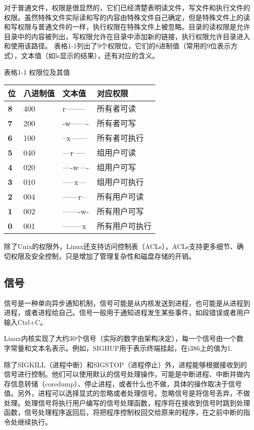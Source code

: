 对于普通文件，权限是很显然的，它们已经清楚表明读文件，写文件和执行文件的权限。虽然特殊文件实际读和写的内容由特殊文件自己确定，但是特殊文件上的读和写权限与普通文件的一样，执行权限在特殊文件上被忽略。目录的读权限是允许目录中的内容被列出，写权限允许在目录中添加新的链接，执行权限允许目录进入和使用该路径。 表格1-1列出了9个权限位，它们的8进制值（常用的9位表示方式），文本值（如ls显示的结果），还有对应的含义。
\begin{flushleft}
表格1-1 权限位及其值
\end{flushleft}
\begin{flushleft}
\begin{tabular}{p{2cm}p{2.8cm}p{2.8cm}p{3.0cm}}\toprule
\rowcolor[gray]{.9}
 \textbf{位} & \textbf{八进制值} & \textbf{文本值} & \textbf{对应权限}\\ \midrule
 \textbf 8 & 400 & r-------- & 所有者可读 \\ 
 \textbf 7 & 200 & -w------- & 所有者可写 \\ 
 \textbf 6 & 100 & --x------ & 所有者可执行 \\ 
 \textbf 5 & 040 & ---r----- & 组用户可读 \\ 
 \textbf 4 & 020 & ----w---- & 组用户可写 \\ 
 \textbf 3 & 010 & -----x--- & 组用户可执行 \\ 
 \textbf 2 & 004 & ------r-- & 所有用户可读 \\ 
 \textbf 1 & 002 & -------w- & 所有用户可写 \\ 
 \textbf 0 & 001 & --------x & 所有用户可执行 \\ 
 \end{tabular}
 \end{flushleft}
除了Unix的权限外，Linux还支持访问控制表（ACLs），ACLs支持更多细节、确切权限及安全控制，只是增加了管理复杂性和磁盘存储的开销。

\subsection{信号}

信号是一种单向异步通知机制，信号可能是从内核发送到进程，也可能是从进程到进程，或者进程给自己。信号一般用于通知进程发生某些事件，如段错误或者用户输入Ctrl+C。

Linux内核实现了大约30个信号（实际的数字由架构决定），每一个信号由一个数字常量和文本名表示。例如，SIGHUP用于表示终端挂起，在i386上的值为1.

除了SIGKILL（进程中断）和SIGSTOP（进程停止）外，进程能够根据接收到的信号进行控制。他们可以使用默认的信号处理操作，可能是中断进程、中断并做内存信息转储（coredump）、停止进程，或者什么也不做，具体的操作取决于信号值。另外，进程可以选择显式的忽略或者处理信号。忽略信号是将信号丢弃，不做处理。处理信号将执行用户编写的信号处理函数，程序将在接收到信号时跳到处理函数，信号处理程序返回后，将把程序控制权回交给原来的程序，在之前中断的指令处继续执行。

